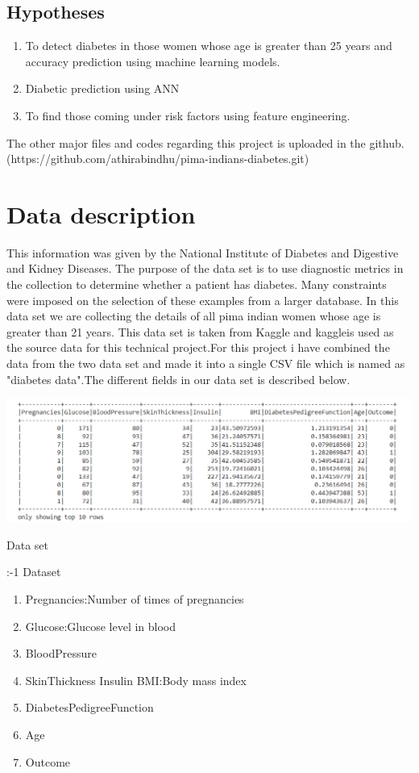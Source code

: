 \documentclass[journal,twoside,web]{ieeecolor}
\begin{document}
\subsection{Hypotheses}
\begin{enumerate}
    \item To detect diabetes in those women whose age is greater than 25 years and accuracy prediction using machine learning models.
     \item Diabetic prediction using ANN
    \item To find those coming under risk factors using feature engineering.
\end{enumerate}
The other major files and codes regarding this project is uploaded in the github.
(https://github.com/athirabindhu/pima-indians-diabetes.git)

\section{Data description}
\label{sec:data description}
This information was given by the National Institute of Diabetes and Digestive and Kidney Diseases. The purpose of the data set is to use diagnostic metrics in the collection to determine whether a patient has diabetes. Many constraints were imposed on the selection of these examples from a larger database. In this data set we are collecting the details of all pima indian women whose age is greater than 21 years.
This data set is taken from Kaggle\cite{DATA} and  kaggle\cite{data}is used as the source data for this technical project.For this project i have combined the data from the two data set and made it into a single CSV file which is named as "diabetes data".The different fields in our data set is described below.

    \includegraphics[scale=0.4]{dataset.png}
    \caption{Data set}
    \label{fig1:}
    \centeringfig:-1 Dataset

\begin{enumerate}
    \item Pregnancies:Number of times of pregnancies 
    \item Glucose:Glucose level in blood
    \item BloodPressure
    \item SkinThickness
    \Item Insulin
    \Item BMI:Body mass index
    \item DiabetesPedigreeFunction
    \item Age
    \item Outcome
\end{enumerate}
\end{document}
